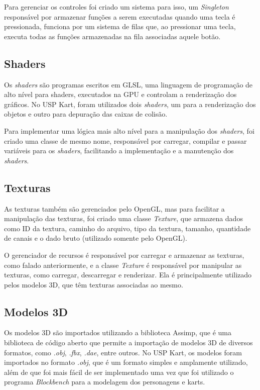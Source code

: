 Para gerenciar os controles foi criado um sistema para isso, um \textit{Singleton} responsável por armazenar funções a serem executadas quando uma tecla é pressionada, funciona por um sistema de filas que, ao pressionar uma tecla, executa todas as funções armazenadas na fila associadas aquele botão.

\subsection{Shaders}

Os \textit{shaders} são programas escritos em GLSL, uma linguagem de programação de alto nível para shaders, executados na GPU e controlam a renderização dos gráficos. No USP Kart, foram utilizados dois \textit{shaders}, um para a renderização dos objetos e outro para depuração das caixas de colisão.

Para implementar uma lógica mais alto nível para a manipulação dos \textit{shaders}, foi criado uma classe de mesmo nome, responsável por carregar, compilar e passar variáveis para os \textit{shaders}, facilitando a implementação e a manutenção dos \textit{shaders}.

\subsection{Texturas}

As texturas também são gerenciados pelo OpenGL, mas para facilitar a manipulação das texturas, foi criado uma classe \textit{Texture}, que armazena dados como ID da textura, caminho do arquivo, tipo da textura, tamanho, quantidade de canais e o dado bruto (utilizado somente pelo OpenGL).

O gerenciador de recursos é responsável por carregar e armazenar as texturas, como falado anteriormente, e a classe \textit{Texture} é responsável por manipular as texturas, como carregar, descarregar e renderizar. Ela é principalmente utilizado pelos modelos 3D, que têm texturas associadas ao mesmo.


\subsection{Modelos 3D}

Os modelos 3D são importados utilizando a biblioteca Assimp, que é uma biblioteca de código aberto que permite a importação de modelos 3D de diversos formatos, como \textit{.obj}, \textit{.fbx}, \textit{.dae}, entre outros. No USP Kart, os modelos foram importados no formato \textit{.obj}, que é um formato simples e amplamente utilizado, além de que foi mais fácil de ser implementado uma vez que foi utilizado o programa \textit{Blockbench} para a modelagem dos personagens e karts.

